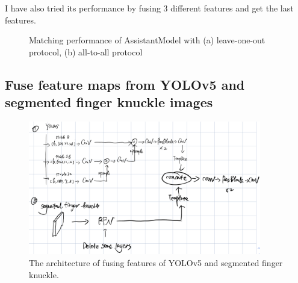 I have also tried its performance by fusing 3 different features and get the last features.
\begin{figure}[h]
    \centering

    \caption{Matching performance of AssistantModel with (a) leave-one-out protocol, (b) all-to-all protocol}
    \label{fusionmodel-roc}
\end{figure}




\subsection{Fuse feature maps from YOLOv5 and segmented finger knuckle images}

\begin{figure}[ht!]
    \centering
    \includegraphics[width=4in]{Figure/04-11-2022/fusionmodel.jpg}
    \caption{The architecture of fusing features of YOLOv5 and segmented finger knuckle.}
    \label{fusionmodel}
\end{figure}

